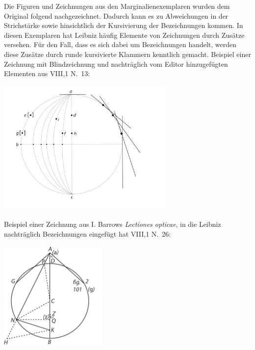 Die Figuren und Zeichnungen aus den Marginalienexemplaren wurden dem Original folgend nachgezeichnet. Dadurch kann es zu Abweichungen in der Strich\-st\"{a}rke sowie hinsichtlich der Kursivierung der Bezeichnungen kommen. In diesen Exemplaren hat Leibniz h\"{a}ufig Elemente von Zeichnungen durch Zus\"{a}tze versehen. F\"{u}r den Fall, dass es sich dabei um Bezeichnungen handelt, werden diese Zus\"{a}tze durch runde kursivierte Klammern kenntlich gemacht.
Beispiel einer Zeichnung mit Blindzeichnung und nachtr\"{a}glich vom Editor hinzugef\"{u}gten Elementen aus VIII,1 N.~13: 
\begin{center}
  \includegraphics[trim = 0mm 0mm 0mm -15mm, clip,width=0.65\textwidth]{images/38_21v.pdf}
\end{center}
\newpage
Beispiel einer Zeichnung aus I. Barrows \textit{Lectiones opticae}, in die Leibniz nachtr\"{a}glich Bezeichnungen eingef\"{u}gt hat VIII,1 N.~26:
\begin{center}
    \includegraphics[trim = 0mm 0mm 0mm -5mm, clip,width=0.4\textwidth]{images/T8_Barrow-2.pdf}
\end{center}
\clearpage